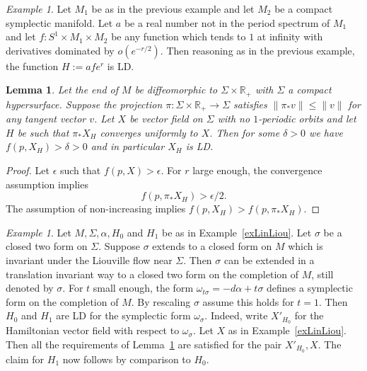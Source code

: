 \documentclass[11pt]{amsart}
\newcommand{\R}{\mathbb{R}}
\newtheorem{lm}[tm]{Lemma}
\theoremstyle{definition}
\theoremstyle{remark}
\newtheorem{ex}[tm]{Example}
\begin{document}
\begin{ex}
Let $M_1$ be as in the previous example and let $M_2$ be a compact symplectic manifold. Let $a$ be a real number not in the period spectrum of $M_1$ and let $f:S^1\times M_1\times M_2$ be any function which tends to $1$ at infinity with derivatives dominated by $o(e^{-r/2})$. Then reasoning as in the previous example, the function $H:=afe^r$ is LD.
\end{ex}
\begin{lm}\label{lmLinDisCrit}
Let the end of $M$ be diffeomorphic to $\Sigma\times\R_+$ with $\Sigma$ a compact hypersurface. Suppose the projection $\pi:\Sigma\times\R_+\to\Sigma$ satisfies $\|\pi_*v\|\leq\|v\|$ for any tangent vector $v$. Let $X$ be vector field on $\Sigma$ with no $1$-periodic orbits and let $H$ be such that $\pi_*X_H$ converges uniformly to $X$. Then for some $\delta>0$ we have $f(p,X_H)>\delta>0 $ and in particular $X_H$ is LD.
\end{lm}
\begin{proof}
Let $\epsilon$ such that $f(p,X)>\epsilon$. For $r$ large enough, the convergence assumption implies
\[
f(p,\pi_*X_H)>\epsilon/2.
\]
The assumption of non-increasing implies $f(p,X_H)>f(p,\pi_*X_H)$.
\end{proof}
\begin{ex}
Let $M,\Sigma,\alpha, H_0$ and $H_1$ be as in Example~\ref{exLinLiou}. Let $\sigma$ be a  closed two form on $\Sigma$. Suppose $\sigma$ extends to a closed form on $M$ which is invariant under the Liouville flow near $\Sigma$. Then $\sigma$ can be extended in a translation invariant way to a closed two form on the completion of $M$, still denoted by $\sigma$. For $t$ small enough, the form $\omega_{t\sigma}=-d\alpha +t\sigma$ defines a symplectic form on the completion of $M$.  By rescaling $\sigma$ assume this holds for $t=1$. Then $H_0$ and $H_1$ are LD for the symplectic form $\omega_\sigma$. Indeed, write $X'_{H_0}$ for the Hamiltonian vector field with respect to $\omega_{\sigma}$. Let $X$ as in Example~\ref{exLinLiou}. Then all the requirements of Lemma~\ref{lmLinDisCrit} are satisfied for the pair $X'_{H_0},X$. The claim for $H_1$ now follows by comparison to $H_0$.
\end{ex}
\end{document}
